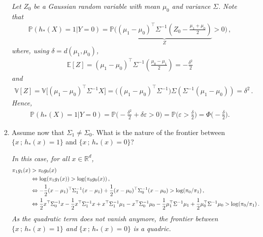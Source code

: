 \documentclass[a4paper,10pt,fleqn]{article}
\newcommand{\eqsp}{\,}
\newcommand{\rset}{\ensuremath{\mathbb{R}}}
\newcommand{\bP}{\mathbb{P}}
\newcommand{\1}{\ensuremath{\mathbbm{1}}}
\newcommand{\bE}{\mathbb{E}}
\begin{document}
\begin{enumerate}
\vspace{.2cm}

{\em
Let $Z_0$ be a Gaussian random variable with mean $\mu_0$ and variance $\Sigma$. Note that 
\begin{align*}
\bP (h_*(X) = 1 | Y = 0) = \bP \Big( \underbrace{(\mu_1 - \mu_0)^\top \Sigma^{-1} (Z_0 - \frac{\mu_1 + \mu_0}{2})}_{Z} > 0 \Big)\eqsp,
\end{align*}
where, using $\delta = d(\mu_{1},\mu_{0})$,   
\begin{align*}
\bE[Z] = (\mu_1 - \mu_0)^\top \Sigma^{-1} (\frac{\mu_0 - \mu_1 }{2})= - \frac{\delta^2}{2}
\end{align*}
and 
\begin{align*}
\mathbb{V}[Z] = \mathbb{V} \Big[ (\mu_1 - \mu_0)^\top \Sigma^{-1} X \Big] = \Big( (\mu_1 - \mu_0)^\top \Sigma^{-1}\Big) \Sigma \left( \Sigma^{-1} (\mu_1 - \mu_0)\right) = \delta^2\eqsp.
\end{align*}
Hence, 
\begin{align*}
\bP (h_*(X) = 1 | Y = 0) = \bP \Big( - \frac{\delta^2}{2} + \delta \varepsilon >0 \Big)= \bP\Big(\varepsilon > \frac{\delta}{2}\Big) = \Phi \Big(-\frac{\delta}{2}\Big).
\end{align*}
}
\item Assume now that $\Sigma_{1}\neq \Sigma_{0}$. What is the nature of the frontier between $\{x\eqsp;\eqsp h_{*}(x)=1\}$ and $\{x\eqsp;\eqsp h_{*}(x)=0\}$?

\vspace{.2cm}

{\em
In this case, for all $x\in\rset^d$, 
\begin{align*}
 \pi_1 g_1(x) &> \pi_0 g_0(x) \\
&\Leftrightarrow  \log(\pi_1 g_1(x)) > \log(\pi_0 g_0(x))\eqsp,\\
&\Leftrightarrow  -{1\over 2}(x-\mu_1)^\top\Sigma_1^{-1}(x-\mu_1) + {1\over 2}(x-\mu_0)^\top\Sigma_0^{-1}(x-\mu_0) > \log(\pi_0/ \pi_1)\eqsp,\\
&\Leftrightarrow	\frac{1}{2}x^\top\Sigma_0^{-1}x  -\frac{1}{2}x^\top\Sigma_1^{-1}x +	 x^\top\Sigma_1^{-1}\mu_1 - x^\top\Sigma_0^{-1}\mu_0 - \frac{1}{2} \mu_1^\top\Sigma^{-1}\mu_1 + \frac{1}{2} \mu_0^\top\Sigma^{-1}\mu_0  > \log(\pi_0/ \pi_1)\eqsp.
\end{align*}
As the quadratic term does not vanish anymore, the frontier between $\{x\eqsp;\eqsp h_{*}(x)=1\}$ and $\{x\eqsp;\eqsp h_{*}(x)=0\}$ is a quadric.
}
\end{enumerate}
\end{document}

